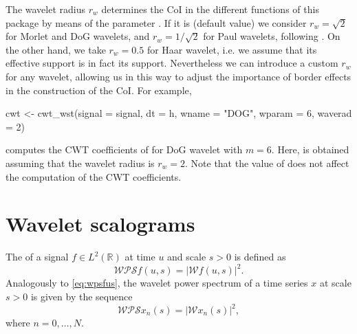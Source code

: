 The wavelet radius $r_w$ determines the CoI in the different functions of this package by means of the parameter . If it is  (default value) we consider $r_w=\sqrt{2}$ for Morlet and DoG wavelets, and $r_w=1/\sqrt{2}$ for Paul wavelets, following \citet{tor98}. On the other hand, we take $r_w=0.5$ for Haar wavelet, i.e. we assume that its effective support is in fact its support. Nevertheless we can introduce a custom $r_w$ for any wavelet, allowing us in this way to adjust the importance of border effects in the construction of the CoI. For example,
\begin{example}
cwt <- cwt_wst(signal = signal, dt = h,
               wname = "DOG", wparam = 6, waverad = 2)
\end{example}
computes the CWT coefficients of  for DoG wavelet with $m=6$. Here,  is obtained assuming that the wavelet radius is $r_w=2$. Note that the value of  does not affect the computation of the CWT coefficients.

\section{Wavelet scalograms}
\label{sec:sc}

The  of a signal $f\in L^2\left( \mathbb{R}\right)$ at time $u$ and scale $s>0$ is defined as
\begin{equation}
\label{eq:wpsfus}
\mathcal{WPS}f\left( u,s\right) = |\mathcal{W}f\left( u,s\right) |^2.
\end{equation}
Analogously to \eqref{eq:wpsfus}, the wavelet power spectrum of a time series $x$ at scale $s>0$ is given by the sequence
\begin{equation}
\label{eq:wpsxns}
\mathcal{WPS}x_n(s) = |\mathcal{W}x_n(s) |^2,
\end{equation}
where $n=0,\ldots,N$.

